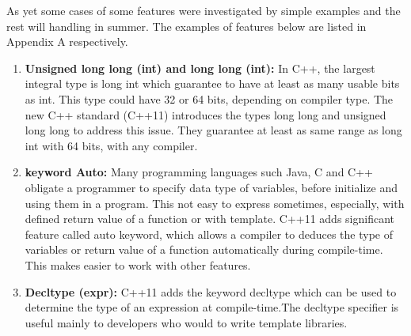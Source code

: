 \documentclass[11pt,]{report}
\begin{document}
As yet some cases of some features were investigated by simple examples and the rest will handling in summer. The examples of features below are listed in Appendix A respectively.
 \begin{enumerate}
\item \textbf{Unsigned long long (int) and long long (int):} In C++, the largest integral type is long int which guarantee to have at least as many  usable bits as int. This type could have 32 or 64 bits, depending on compiler type. The new C++ standard (C++11) introduces the types long long and  unsigned long long to address this issue. They guarantee at least as same range as long int with 64 bits, with any compiler\cite{Gregorie:professionalcpp}.

\item \textbf{keyword Auto:} Many programming languages such Java, C and C++ obligate a programmer to specify data type of variables, before initialize  and using them in a program. This not easy to express sometimes, especially, with defined return value of a function or with template. C++11 adds significant feature called auto keyword, which allows a compiler to deduces the type of variables or return value of a function automatically during compile-time. This makes easier to work with other features\cite{Prata:2012:Cpp}.

\item \textbf{Decltype (expr):} C++11 adds the keyword decltype which can be used to determine the type of an expression at compile-time.\linebreak The decltype specifier is useful mainly to developers who would to write template libraries\cite{Gregorie:professionalcpp}.


\end{enumerate}
\end{document}
